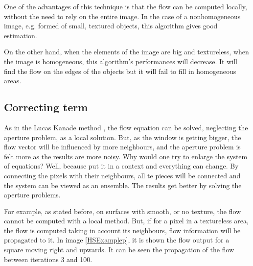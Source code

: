 \documentclass[12pt,a4paper,twoside]{report}
\begin{document}
{One  of the advantages of this technique is that the flow can be computed locally, without the need to rely on the entire image. In the case of a nonhomogeneous image, e.g. formed of small, textured objects, this algorithm gives good estimation. 

On the other hand, when the elements of the image are big and textureless, when the image is homogeneous,  this algorithm's performances will decrease. It will find the flow on the edges of the objects but it will fail to fill in homogeneous areas.

\subsection{Correcting term}
As in the Lucas Kanade method \cite{lucas1981}, the flow equation can be solved, neglecting the aperture problem, as a local solution. But, as the window is getting bigger, the flow vector will be influenced by more neighbours, and the aperture problem is felt more as the results are more noisy. Why would one try to enlarge the system of equations? Well, because put it in a context and everything can change. By connecting the pixels with their neighbours, all te pieces will be connected and the system can be viewed as an ensemble. The results get better by solving the aperture problems. 


For example, as stated before, on surfaces with smooth, or no texture, the flow cannot be computed with a local method. But, if for a pixel in a textureless area, the flow is computed taking in account its neighbours, flow information will be propagated to it. In image \ref{HSExamplep}, it is shown the flow output for a square moving right and upwards. It can be seen the propagation of the flow between iterations 3 and 100.

}
\end{document}
